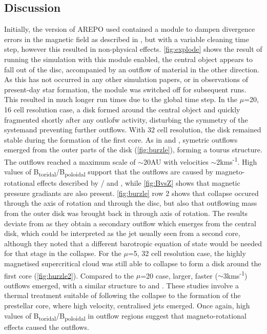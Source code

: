 \documentclass[11pt]{article}
\begin{document}
\subsection{Discussion}
\label{sub:discussion1}

Initially, the version of AREPO used contained a module to dampen divergence errors in the magnetic field as described in \cite{Dedner2002}, but with a variable cleaning time step, however this resulted in non-physical effects. \autoref{fig:explode} shows the result of running the simulation with this module enabled, the central object appears to fall out of the disc, accompanied by an outflow of material in the other direction. As this has not occurred in any other simulation papers, or in observations of present-day star formation, the module was switched off for subsequent runs. This resulted in much longer run times due to the global time step.
In the $\mu$=20, 16 cell resolution case, a  disk formed around the central object and quickly fragmented shortly after any outlofw activity, disturbing the symmetry of the systemand preventing further outflows. With 32 cell resolution, the disk remained stable during the formation of the first core. As in \cite{Hennebelle2008} and \cite{Bate2014}, symetric outflows emerged  from the outer parts of the disk (\autoref{fig:burzle}), forming a tourus structure. The outflows reached a maximum scale of $\sim$20AU with velocities $\sim$2kms\textsuperscript{-1}. High values of B\textsubscript{toridal}/B\textsubscript{poloidal} support that the outflows are caused by magneto-rotational effects described by /\cite{Blandford1982} and \cite{Lynden-Bell2003}, while  \autoref{fig:BvsZ} shows that magnetic pressure gradiants are also present.  \autoref{fig:burzle} row 2 shows that collapse occured through the axis of rotation and through the disc, but also that outflowing mass from the outer disk was brought back in through axis of rotation. The results deviate from \cite{Burzle2011} as they obtain a secondary outflow which emerges from the central disk, which could be interpreted as the jet usually seen from a second core, although they noted that a different barotropic equation of state would be needed for that stage in the collapse.
For the $\mu$=5, 32 cell resolution case, the highly magnetised supercritical cloud was still able to collapse to form a disk around the first core (\autoref{fig:burzle2}). Compared to the $\mu$=20 case,  larger, faster ($\sim$3kms\textsuperscript{-1}) outflows emerged, with a similar structure to \cite{Machida2014} and \cite{Bate2014}. These studies involve a thermal treatment suitable of following the collapse to the formation of the prestellar core, where high velocity, centralised jets  emerged. Once again, high values of B\textsubscript{toridal}/B\textsubscript{poloidal} in outflow regions suggest that magneto-rotational effects caused the outflows. 
\end{document}
